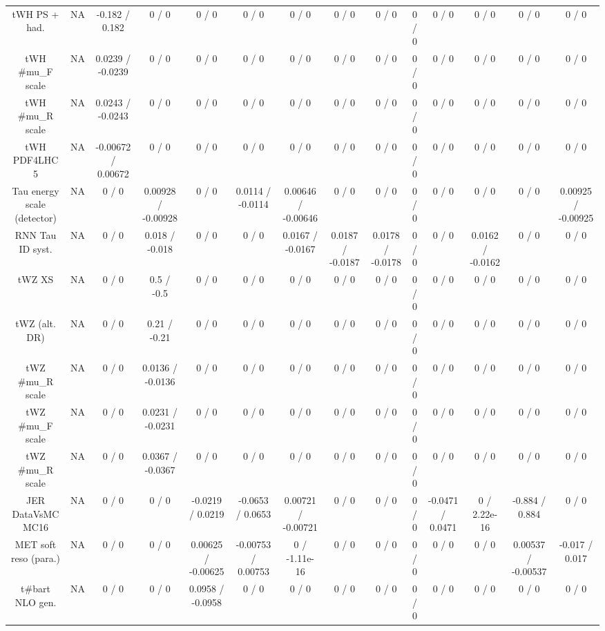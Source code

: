 \documentclass[10pt]{article}
\begin{document}
\begin{table}[htbp]
\begin{center}
\begin{tabular}{|c|c|c|c|c|c|c|c|c|c|c|c|c|c|}
  tWH PS + had. &    NA    & -0.182 / 0.182 & 0 / 0 & 0 / 0 & 0 / 0 & 0 / 0 & 0 / 0 & 0 / 0 & 0 / 0 & 0 / 0 & 0 / 0 & 0 / 0 & 0 / 0 \\ 
  tWH #mu_{F} scale &    NA    & 0.0239 / -0.0239 & 0 / 0 & 0 / 0 & 0 / 0 & 0 / 0 & 0 / 0 & 0 / 0 & 0 / 0 & 0 / 0 & 0 / 0 & 0 / 0 & 0 / 0 \\ 
  tWH #mu_{R} scale &    NA    & 0.0243 / -0.0243 & 0 / 0 & 0 / 0 & 0 / 0 & 0 / 0 & 0 / 0 & 0 / 0 & 0 / 0 & 0 / 0 & 0 / 0 & 0 / 0 & 0 / 0 \\ 
  tWH PDF4LHC 5 &    NA    & -0.00672 / 0.00672 & 0 / 0 & 0 / 0 & 0 / 0 & 0 / 0 & 0 / 0 & 0 / 0 & 0 / 0 & 0 / 0 & 0 / 0 & 0 / 0 & 0 / 0 \\ 
  Tau energy scale (detector) &    NA    & 0 / 0 & 0.00928 / -0.00928 & 0 / 0 & 0.0114 / -0.0114 & 0.00646 / -0.00646 & 0 / 0 & 0 / 0 & 0 / 0 & 0 / 0 & 0 / 0 & 0 / 0 & 0.00925 / -0.00925 \\ 
  RNN Tau ID syst. &    NA    & 0 / 0 & 0.018 / -0.018 & 0 / 0 & 0 / 0 & 0.0167 / -0.0167 & 0.0187 / -0.0187 & 0.0178 / -0.0178 & 0 / 0 & 0 / 0 & 0.0162 / -0.0162 & 0 / 0 & 0 / 0 \\ 
  tWZ XS &    NA    & 0 / 0 & 0.5 / -0.5 & 0 / 0 & 0 / 0 & 0 / 0 & 0 / 0 & 0 / 0 & 0 / 0 & 0 / 0 & 0 / 0 & 0 / 0 & 0 / 0 \\ 
  tWZ (alt. DR) &    NA    & 0 / 0 & 0.21 / -0.21 & 0 / 0 & 0 / 0 & 0 / 0 & 0 / 0 & 0 / 0 & 0 / 0 & 0 / 0 & 0 / 0 & 0 / 0 & 0 / 0 \\ 
  tWZ #mu_{R} scale &    NA    & 0 / 0 & 0.0136 / -0.0136 & 0 / 0 & 0 / 0 & 0 / 0 & 0 / 0 & 0 / 0 & 0 / 0 & 0 / 0 & 0 / 0 & 0 / 0 & 0 / 0 \\ 
  tWZ #mu_{F} scale &    NA    & 0 / 0 & 0.0231 / -0.0231 & 0 / 0 & 0 / 0 & 0 / 0 & 0 / 0 & 0 / 0 & 0 / 0 & 0 / 0 & 0 / 0 & 0 / 0 & 0 / 0 \\ 
  tWZ #mu_{R} scale &    NA    & 0 / 0 & 0.0367 / -0.0367 & 0 / 0 & 0 / 0 & 0 / 0 & 0 / 0 & 0 / 0 & 0 / 0 & 0 / 0 & 0 / 0 & 0 / 0 & 0 / 0 \\ 
  JER DataVsMC MC16 &    NA    & 0 / 0 & 0 / 0 & -0.0219 / 0.0219 & -0.0653 / 0.0653 & 0.00721 / -0.00721 & 0 / 0 & 0 / 0 & 0 / 0 & -0.0471 / 0.0471 & 0 / 2.22e-16 & -0.884 / 0.884 & 0 / 0 \\ 
  MET soft reso (para.) &    NA    & 0 / 0 & 0 / 0 & 0.00625 / -0.00625 & -0.00753 / 0.00753 & 0 / -1.11e-16 & 0 / 0 & 0 / 0 & 0 / 0 & 0 / 0 & 0 / 0 & 0.00537 / -0.00537 & -0.017 / 0.017 \\ 
  t#bar{t} NLO gen. &    NA    & 0 / 0 & 0 / 0 & 0.0958 / -0.0958 & 0 / 0 & 0 / 0 & 0 / 0 & 0 / 0 & 0 / 0 & 0 / 0 & 0 / 0 & 0 / 0 & 0 / 0 \\ 

\end{tabular}
\end{center}
\end{table}
\end{document}
